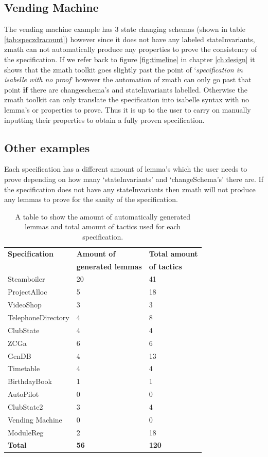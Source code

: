 \subsection{Vending Machine}

The vending machine example has 3 state changing schemas (shown in table \ref{tab:speczdracount}) however since it does not have any labeled stateInvariants, \gls{zmath} can not automatically produce any properties to prove the consistency of the specification. If we refer back to figure \ref{fig:timeline} in chapter \ref{ch:design} it shows that the \gls{zmath} toolkit goes slightly past the point of `\emph{specification in isabelle with no proof}' however the automation of \gls{zmath} can only go past that point \textbf{if} there are changeschema's and stateInvariants labelled. Otherwise the \gls{zmath} toolkit can only translate the specification into isabelle syntax with no lemma's or properties to prove. Thus it is up to the user to carry on manually inputting their properties to obtain a fully proven specification.

\subsection{Other examples}

Each specification has a different amount of lemma's which the user needs to prove depending on how many `stateInvariants' and `changeSchema's' there are. If the specification does not have any stateInvariants then \gls{zmath} will not produce any lemmas to prove for the sanity of the specification.

\begin{table}
\begin{tabular}{|l | l | l |}
\hline
\textbf{Specification} & \textbf{Amount of} & \textbf{Total amount} \\
& \textbf{generated lemmas} & \textbf{of tactics} \\
\hline
Steamboiler & 20 & 41 \\
ProjectAlloc & 5 & 18 \\
VideoShop & 3 & 3 \\
TelephoneDirectory & 4 & 8 \\
ClubState & 4 & 4 \\
ZCGa & 6 & 6 \\
GenDB & 4 & 13 \\
Timetable & 4 & 4 \\
BirthdayBook & 1 & 1\\
AutoPilot & 0 & 0 \\
ClubState2 & 3 & 4 \\
Vending Machine & 0 & 0 \\
ModuleReg & 2 & 18 \\
\hline
\textbf{Total} & \textbf{56} & \textbf{120}\\
\hline
\end{tabular}
\caption{A table to show the amount of automatically generated lemmas and total amount of tactics used for each specification. \label{tab:lemmatact}}
\end{table}

